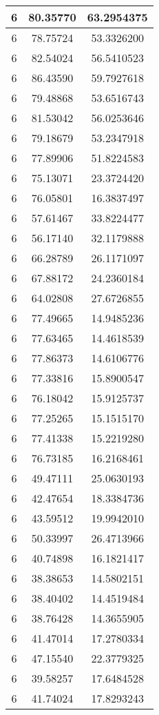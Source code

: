 \documentclass[
]{book}
\begin{document}
\begin{tabular}{c|c|c}
\hline
6 & 80.35770 & 63.2954375\\
\hline
6 & 78.75724 & 53.3326200\\
\hline
6 & 82.54024 & 56.5410523\\
\hline
6 & 86.43590 & 59.7927618\\
\hline
6 & 79.48868 & 53.6516743\\
\hline
6 & 81.53042 & 56.0253646\\
\hline
6 & 79.18679 & 53.2347918\\
\hline
6 & 77.89906 & 51.8224583\\
\hline
6 & 75.13071 & 23.3724420\\
\hline
6 & 76.05801 & 16.3837497\\
\hline
6 & 57.61467 & 33.8224477\\
\hline
6 & 56.17140 & 32.1179888\\
\hline
6 & 66.28789 & 26.1171097\\
\hline
6 & 67.88172 & 24.2360184\\
\hline
6 & 64.02808 & 27.6726855\\
\hline
6 & 77.49665 & 14.9485236\\
\hline
6 & 77.63465 & 14.4618539\\
\hline
6 & 77.86373 & 14.6106776\\
\hline
6 & 77.33816 & 15.8900547\\
\hline
6 & 76.18042 & 15.9125737\\
\hline
6 & 77.25265 & 15.1515170\\
\hline
6 & 77.41338 & 15.2219280\\
\hline
6 & 76.73185 & 16.2168461\\
\hline
6 & 49.47111 & 25.0630193\\
\hline
6 & 42.47654 & 18.3384736\\
\hline
6 & 43.59512 & 19.9942010\\
\hline
6 & 50.33997 & 26.4713966\\
\hline
6 & 40.74898 & 16.1821417\\
\hline
6 & 38.38653 & 14.5802151\\
\hline
6 & 38.40402 & 14.4519484\\
\hline
6 & 38.76428 & 14.3655905\\
\hline
6 & 41.47014 & 17.2780334\\
\hline
6 & 47.15540 & 22.3779325\\
\hline
6 & 39.58257 & 17.6484528\\
\hline
6 & 41.74024 & 17.8293243\\

\end{tabular}
\end{document}
